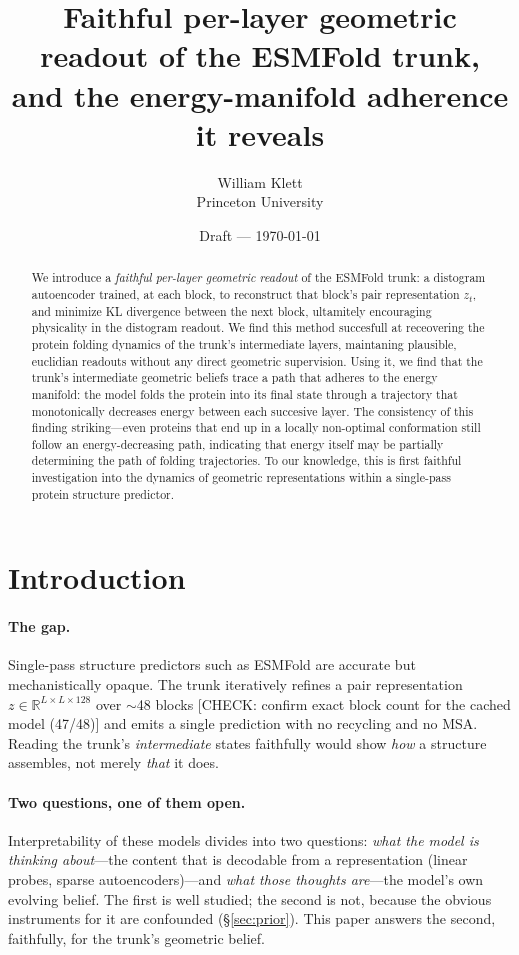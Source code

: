 \documentclass[11pt]{article}
\title{\bfseries Faithful per-layer geometric readout of the ESMFold trunk,\\
and the energy-manifold adherence it reveals}
\author{William Klett\\\small Princeton University}
\date{Draft --- \today}
\newcommand{\CHECK}[1]{{\color{orange!80!black}\small\textsf{[CHECK: #1]}}}
\begin{document}
\maketitle

\begin{abstract}
\noindent
We introduce a \emph{faithful per-layer geometric readout} of the ESMFold trunk:
a distogram autoencoder trained, at each block, to reconstruct that block's pair
representation $z_t$, and minimize KL divergence between the next block, ultamitely 
encouraging physicality in the distogram readout. We find this method succesfull
at receovering the protein folding dynamics of the trunk's intermediate layers, maintaning plausible, 
euclidian readouts without any direct geometric supervision. 
Using it, we find that the trunk's intermediate geometric beliefs trace a path that adheres to the
energy manifold: the model folds the protein into its final state through a trajectory 
that monotonically decreases energy between each succesive layer. The consistency of this 
finding striking---even proteins that end up in a locally non-optimal conformation still follow an 
energy-decreasing path, indicating that energy itself may be partially determining the path of folding trajectories.
To our knowledge, this is first faithful investigation into the dynamics of geometric 
representations within a single-pass protein structure predictor.
\end{abstract}

\section{Introduction}
\label{sec:intro}

\paragraph{The gap.}
Single-pass structure predictors such as ESMFold are accurate but mechanistically
opaque. The trunk iteratively refines a pair representation
$z \in \mathbb{R}^{L\times L\times 128}$ over $\sim$48 blocks
\CHECK{confirm exact block count for the cached model (47/48)} and emits a single
prediction with no recycling and no MSA. Reading the trunk's \emph{intermediate}
states faithfully would show \emph{how} a structure assembles, not merely
\emph{that} it does.

\paragraph{Two questions, one of them open.}
Interpretability of these models divides into two questions: \emph{what the model
is thinking about}---the content that is decodable from a representation (linear
probes, sparse autoencoders)---and \emph{what those thoughts are}---the model's
own evolving belief. The first is well studied; the second is not, because the
obvious instruments for it are confounded (\S\ref{sec:prior}). This paper answers
the second, faithfully, for the trunk's geometric belief.
\end{document}
